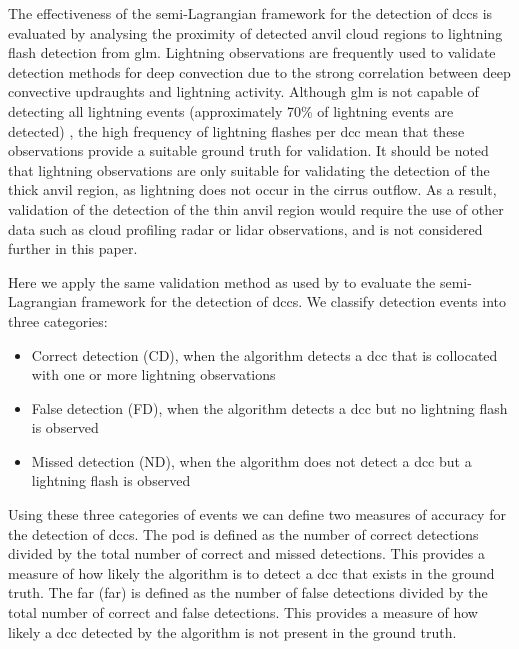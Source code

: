 The effectiveness of the semi-Lagrangian framework for the detection of \acrshort{dcc}s is evaluated by analysing the proximity of detected anvil cloud regions to lightning flash detection from \acrshort{glm}.
Lightning observations are frequently used to validate detection methods for deep convection \citep[e.g.][]{zinner_validation_2013, muller_novel_2019} due to the strong correlation between deep convective updraughts and lightning activity.
Although \acrshort{glm} is not capable of detecting all lightning events (approximately 70\% of lightning events are detected) \citep{peterson_removing_2020}, the high frequency of lightning flashes per \acrshort{dcc} mean that these observations provide a suitable ground truth for validation.
It should be noted that lightning observations are only suitable for validating the detection of the thick anvil region, as lightning does not occur in the cirrus outflow.
As a result, validation of the detection of the thin anvil region would require the use of other data such as cloud profiling radar or lidar observations, and is not considered further in this paper.

Here we apply the same validation method as used by \citet{muller_novel_2019} to evaluate the semi-Lagrangian framework for the detection of \acrshort{dcc}s.
We classify detection events into three categories:

\begin{itemize}
    \item Correct detection (CD), when the algorithm detects a \acrshort{dcc} that is collocated with one or more lightning observations
    \item False detection (FD), when the algorithm detects a \acrshort{dcc} but no lightning flash is observed
    \item Missed detection (ND), when the algorithm does not detect a \acrshort{dcc} but a lightning flash is observed
\end{itemize}

Using these three categories of events we can define two measures of accuracy for the detection of \acrshort{dcc}s.
The \acrshort{pod} is defined as the number of correct detections divided by the total number of correct and missed detections.
This provides a measure of how likely the algorithm is to detect a \acrshort{dcc} that exists in the ground truth.
The \acrshort{far} (\acrshort{far}) is defined as the number of false detections divided by the total number of correct and false detections.
This provides a measure of how likely a \acrshort{dcc} detected by the algorithm is not present in the ground truth.


